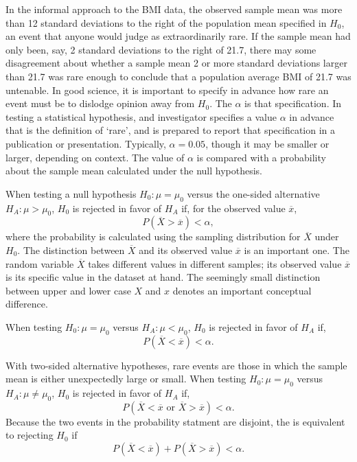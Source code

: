 \begin{spacing}{1.5}
In the informal approach to the BMI data, the observed sample mean was more than 12 standard deviations to the right of the population mean specified in $H_0$, an event that anyone would judge as extraordinarily rare.  If the sample mean had only been, say, 2 standard deviations to the right of 21.7, there may some disagreement about whether a sample mean 2 or  more standard deviations larger than 21.7 was rare enough to conclude that a population average BMI of 21.7 was untenable.  In good science, it is important to specify in advance how rare an event must be to dislodge opinion away from $H_0$.  The  $\alpha$ is that specification. In testing a statistical hypothesis, and investigator specifies a value $\alpha$ in advance  that is the definition of `rare', and is prepared to report that specification in a publication or presentation.  Typically, $\alpha = 0.05$, though it may be smaller or larger, depending on context.  The value of $\alpha$ is compared with a probability about the sample mean calculated under the null hypothesis.

When testing a null hypothesis $H_0:\mu = \mu_0$ versus the one-sided alternative $H_A:\mu > \mu_0$, $H_0$ is rejected in favor of $H_A$ if, for the observed value $\overline{x}$,
\begin{equation*}
	 P(\overline{X} > \overline{x}) < \alpha,
\end{equation*}
where the probability is calculated using the sampling distribution for $\overline{X}$ under $H_0$.  The distinction between $\overline{X}$ and its observed value $\overline{x}$ is an important one. The random variable $\overline{X}$ takes different values in different samples; its observed value $\overline{x}$
is its specific value in the dataset at  hand.  The seemingly small distinction between upper and lower case $X$ and $x$ denotes an important conceptual difference.

When testing $H_0: \mu = \mu_0$ versus  $H_A:\mu < \mu_0$, $H_0$ is rejected in favor of $H_A$ if, 
\begin{equation*}
	 P(\overline{X} < \overline{x}) < \alpha.
\end{equation*}

With two-sided alternative  hypotheses, rare events are those in which the sample mean is either unexpectedly large or small.   When testing $H_0: \mu = \mu_0$ versus  $H_A:\mu \ne \mu_0$, $H_0$ is rejected in favor of $H_A$ if, 
\begin{equation*}
	 P(\overline{X} < \overline{x} \text{ or } \overline{X} > \overline{x}) < \alpha.
\end{equation*}
Because the two events in the probability statment are disjoint, the is equivalent to rejecting $H_0$ if 
\begin{equation*}
	 P(\overline{X} < \overline{x}) + P(\overline{X} > \overline{x}) < \alpha.
\end{equation*}


\end{spacing}
